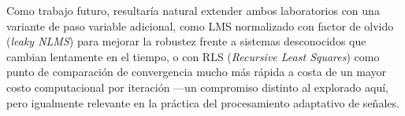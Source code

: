 Como trabajo futuro, resultaría natural extender ambos laboratorios
con una variante de paso variable adicional, como LMS normalizado con
factor de olvido (\textit{leaky NLMS}) para mejorar la robustez frente
a sistemas desconocidos que cambian lentamente en el tiempo, o con
RLS (\textit{Recursive Least Squares}) como punto de comparación de
convergencia mucho más rápida a costa de un mayor costo computacional
por iteración —un compromiso distinto al explorado aquí, pero
igualmente relevante en la práctica del procesamiento adaptativo de
señales.
